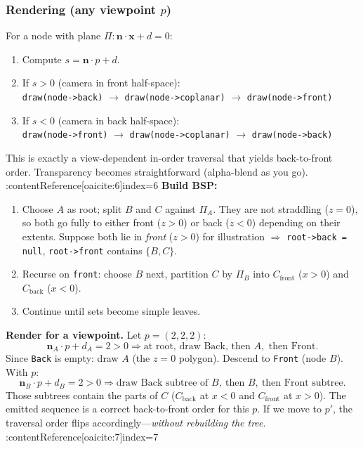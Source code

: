\documentclass[8pt,twocolumn]{extarticle}
\begin{document}
\subsubsection*{Rendering (any viewpoint $p$)}
For a node with plane $\Pi:\mathbf{n}\cdot\mathbf{x}+d=0$:
\begin{enumerate}
  \item Compute $s=\mathbf{n}\cdot p + d$.
  \item If $s>0$ (camera in front half-space): \\
        \hspace*{1em} \texttt{draw(node->back)} $\rightarrow$ \texttt{draw(node->coplanar)} $\rightarrow$ \texttt{draw(node->front)}
  \item If $s<0$ (camera in back half-space): \\
        \hspace*{1em} \texttt{draw(node->front)} $\rightarrow$ \texttt{draw(node->coplanar)} $\rightarrow$ \texttt{draw(node->back)}
\end{enumerate}
This is exactly a view-dependent in-order traversal that yields back-to-front order. Transparency becomes straightforward (alpha-blend as you go). :contentReference[oaicite:6]{index=6}
\textbf{Build BSP:}
\begin{enumerate}
  \item Choose $A$ as root; split $B$ and $C$ against $\Pi_A$. They are not straddling ($z=0$), so both go fully to either front ($z>0$) or back ($z<0$) depending on their extents. Suppose both lie in \emph{front} ($z>0$) for illustration $\Rightarrow$ \texttt{root->back = null}, \texttt{root->front} contains $\{B,C\}$.
  \item Recurse on \texttt{front}: choose $B$ next, partition $C$ by $\Pi_B$ into $C_\text{front}$ ($x>0$) and $C_\text{back}$ ($x<0$).
  \item Continue until sets become simple leaves.
\end{enumerate}

\textbf{Render for a viewpoint.}
Let $p=(2,2,2)$:
\[
\mathbf{n}_A\cdot p + d_A = 2>0 \Rightarrow \text{at root, draw Back, then }A,\text{ then Front}.
\]
Since \texttt{Back} is empty: draw $A$ (the $z=0$ polygon). Descend to \texttt{Front} (node $B$). With $p$:
\[
\mathbf{n}_B\cdot p + d_B = 2>0 \Rightarrow \text{draw Back subtree of }B,\ \text{then }B,\ \text{then Front subtree}.
\]
Those subtrees contain the parts of $C$ ($C_\text{back}$ at $x<0$ and $C_\text{front}$ at $x>0$). The emitted sequence is a correct back-to-front order for this $p$. If we move to $p'$, the traversal order flips accordingly—\emph{without rebuilding the tree}. :contentReference[oaicite:7]{index=7}
\end{document}
